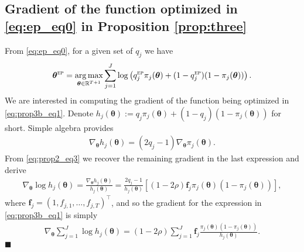 \documentclass[12pt]{article}
\newcommand{\mb}[1]{\mathbf{#1}}
\newcommand{\tr}[1]{#1^{\intercal}}
\DeclareMathOperator*{\argmax}{arg\,max}
\newcommand{\btheta}{{\bm{\theta}}}
\newcommand{\bthetaep}{\btheta^{\textsc{ep}}}
\begin{document}
\subsection{Gradient of the function optimized in \eqref{eq:ep_eq0} in Proposition \ref{prop:three}} \label{sec:gradEP}

From \eqref{eq:ep_eq0}, for a given set of $q_{j}$ we have
\begin{align}
\bthetaep = \argmax_{\btheta \in \mathbb{R}^{T+1}} \sum_{j=1}^{J} \log \left( q_{j}^{\textsc{ep}} \pi_j(\btheta) + (1-q_{j}^{\textsc{ep}}) (1-\pi_j(\btheta)) \right). \label{eq:prop3b_eq1}
\end{align}
We are interested in computing the gradient of the function being optimized in \eqref{eq:prop3b_eq1}. Denote $h_{j}(\btheta) := q_{j} \pi_{j}(\btheta) + (1-q_{j}) (1-\pi_{j}(\btheta))$ for short. Simple algebra provides
\begin{align*}
\nabla_{\btheta} h_{j}(\btheta) = (2 q_j - 1) \nabla_{\btheta} \pi_{j}(\btheta).
\end{align*}
From \eqref{eq:prop2_eq3} we recover the remaining gradient in the last expression and derive
\begin{align*}
\nabla_{\btheta} \log h_{j}(\btheta) = \frac{\nabla_{\btheta} h_{j}(\btheta)}{h_{j}(\btheta)} = \frac{2 q_{j} - 1}{h_{j}(\btheta)} \left[ (1-2\rho) \mb{f}_{j}  \pi_{j}(\btheta) (1-\pi_{j}(\btheta)) \right],
\end{align*}
where $\mb{f}_{j} = \tr{(1, f_{j,1}, \dots, f_{j,T})}$, and so the gradient for the expression in \eqref{eq:prop3b_eq1} is simply
\begin{align*}
\nabla_{\btheta} \sum_{j=1}^{J} \log h_{j}(\btheta) = (1-2\rho) \sum_{j=1}^{J} \mb{f}_{j} \frac{\pi_{j}(\btheta) (1-\pi_{j}(\btheta))}{h_{j}(\btheta)}.
\end{align*}
\hfill $\blacksquare$
\end{document}
